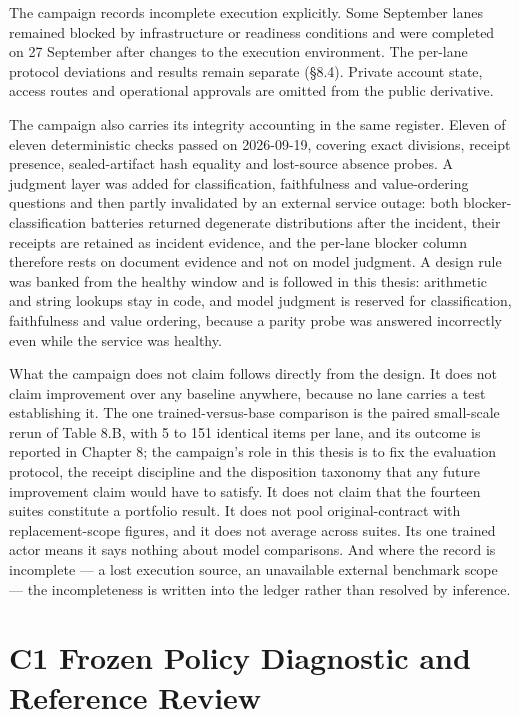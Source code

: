 \documentclass[12pt,a4paper]{report}
\begin{document}
The campaign records incomplete execution explicitly. Some September
lanes remained blocked by infrastructure or readiness conditions and
were completed on 27 September after changes to the execution
environment. The per-lane protocol deviations and results remain
separate (§8.4). Private account state, access routes and operational
approvals are omitted from the public derivative.

The campaign also carries its integrity accounting in the same register.
Eleven of eleven deterministic checks passed on 2026-09-19, covering
exact divisions, receipt presence, sealed-artifact hash equality and
lost-source absence probes. A judgment layer was added for
classification, faithfulness and value-ordering questions and then
partly invalidated by an external service outage: both
blocker-classification batteries returned degenerate distributions after
the incident, their receipts are retained as incident evidence, and the
per-lane blocker column therefore rests on document evidence and not on
model judgment. A design rule was banked from the healthy window and is
followed in this thesis: arithmetic and string lookups stay in code, and
model judgment is reserved for classification, faithfulness and value
ordering, because a parity probe was answered incorrectly even while the
service was healthy.

What the campaign does not claim follows directly from the design. It
does not claim improvement over any baseline anywhere, because no lane
carries a test establishing it. The one trained-versus-base comparison
is the paired small-scale rerun of Table 8.B, with 5 to 151 identical
items per lane, and its outcome is reported in Chapter 8; the campaign's
role in this thesis is to fix the evaluation protocol, the receipt
discipline and the disposition taxonomy that any future improvement
claim would have to satisfy. It does not claim that the fourteen suites
constitute a portfolio result. It does not pool original-contract with
replacement-scope figures, and it does not average across suites. Its
one trained actor means it says nothing about model comparisons. And
where the record is incomplete --- a lost execution source, an
unavailable external benchmark scope --- the incompleteness is written
into the ledger rather than resolved by inference.

\section{C1 Frozen Policy Diagnostic and Reference
Review}\label{c1-frozen-policy-diagnostic-and-reference-review}
\end{document}
